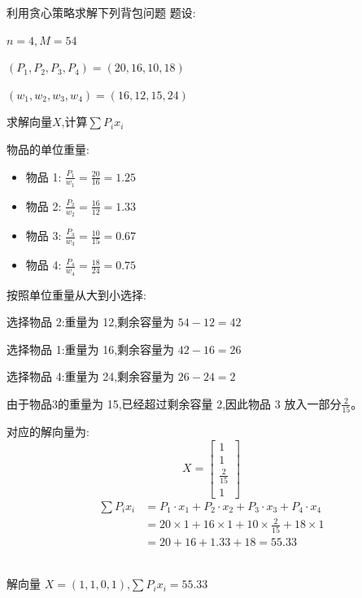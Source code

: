 \documentclass[../../main.tex]{subfiles}
\begin{document}
\begin{problem}
利用贪心策略求解下列背包问题
题设:

\(n=4,M=54\)

\((P_1,P_2,P_3,P_4)=(20,16,10,18)\)

\((w_1,w_2,w_3,w_4)=(16,12,15,24)\)

求解向量\(X\),计算\(\sum P_ix_i\)
\end{problem}
\begin{solution}
    物品的单位重量:
    \begin{itemize}
    \item 物品 1: \( \frac{P_1}{w_1} = \frac{20}{16} = 1.25 \)
    \item 物品 2: \( \frac{P_2}{w_2} = \frac{16}{12} = 1.33 \)
    \item 物品 3: \( \frac{P_3}{w_3} = \frac{10}{15} = 0.67 \)
    \item 物品 4: \( \frac{P_4}{w_4} = \frac{18}{24} = 0.75 \) 
    \end{itemize}

    按照单位重量从大到小选择:

    选择物品 2:重量为 12,剩余容量为 \( 54 - 12 = 42 \)

    选择物品 1:重量为 16,剩余容量为 \( 42 - 16 = 26 \)

    选择物品 4:重量为 24,剩余容量为 \( 26 - 24 = 2 \)

    由于物品3的重量为 15,已经超过剩余容量 2,因此物品 3 放入一部分\(\frac{2}{15}\)。
    
    对应的解向量为:
    \[
    X = \begin{bmatrix}
    1 \\
    1 \\
    \frac{2}{15} \\
    1
    \end{bmatrix}
    \]
    \[
    \begin{aligned}
    \sum P_i x_i 
    &= P_1 \cdot x_1 + P_2 \cdot x_2 + P_3 \cdot x_3 + P_4 \cdot x_4\\
    &= 20 \times 1 + 16 \times 1 + 10 \times \frac{2}{15} + 18 \times 1 \\
    &= 20 + 16 + 1.33 + 18 = 55.33
    \end{aligned}
    \]

    ~\\
    解向量 \(X = (1, 1, 0, 1)\),\( \sum P_i x_i = 55.33 \)
\end{solution}
\end{document}
